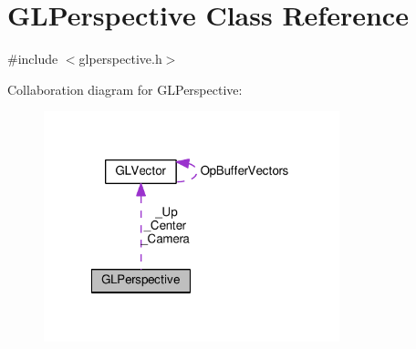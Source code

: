 \hypertarget{classGLPerspective}{
\section{\-G\-L\-Perspective \-Class \-Reference}
\label{d1/d8f/classGLPerspective}
}


{\ttfamily \#include $<$glperspective.\-h$>$}



\-Collaboration diagram for \-G\-L\-Perspective\-:
\nopagebreak
\begin{figure}[H]
\begin{center}
\leavevmode
\includegraphics[width=243pt]{de/d2d/classGLPerspective__coll__graph}
\end{center}
\end{figure}
